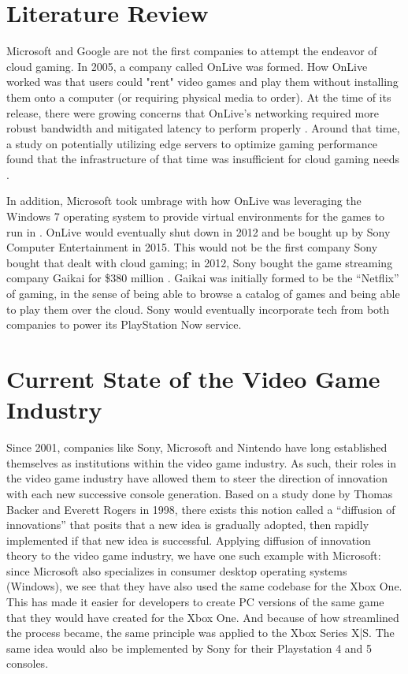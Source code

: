 \documentclass[titlepage, 12pt]{article}
\begin{document}
\section{Literature Review}

Microsoft and Google are not the first companies to attempt the endeavor of cloud gaming. In 2005, a company called OnLive was formed. How OnLive worked was that users could "rent" video games and play them without installing them onto a computer (or requiring physical media to order). At the time of its release, there were growing concerns that OnLive's networking required more robust bandwidth and mitigated latency to perform properly \citep{multimedia-systems3}. Around that time, a study on potentially utilizing edge servers to optimize gaming performance found that the infrastructure of that time was insufficient for cloud gaming needs \citep{multimedia-systems2}.

In addition, Microsoft took umbrage with how OnLive was leveraging the Windows 7 operating system to provide virtual environments for the games to run in \citep{macworld}. OnLive would eventually shut down in 2012 and be bought up by Sony Computer Entertainment in 2015. This would not be the first company Sony bought that dealt with cloud gaming; in 2012, Sony bought the game streaming company Gaikai for \$380 million \citep{engadget}. Gaikai was initially formed to be the “Netflix” of gaming, in the sense of being able to browse a catalog of games and being able to play them over the cloud. Sony would eventually incorporate tech from both companies to power its PlayStation Now service.

\section{Current State of the Video Game Industry}

Since 2001, companies like Sony, Microsoft and Nintendo have long established themselves as institutions within the video game industry. As such, their roles in the video game industry have allowed them to steer the direction of innovation with each new successive console generation. Based on a study done by Thomas Backer and Everett Rogers in 1998, there exists this notion called a “diffusion of innovations” that posits that a new idea is gradually adopted, then rapidly implemented if that new idea is successful. Applying diffusion of innovation theory to the video game industry, we have one such example with Microsoft: since Microsoft also specializes in consumer desktop operating systems (Windows), we see that they have also used the same codebase for the Xbox One. This has made it easier for developers to create PC versions of the same game that they would have created for the Xbox One. And because of how streamlined the process became, the same principle was applied to the Xbox Series X|S. The same idea would also be implemented by Sony for their Playstation 4 and 5 consoles. 
\end{document}
